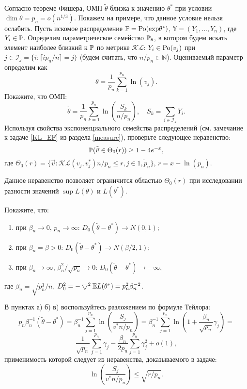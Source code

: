 \begin{problem}
Согласно теореме Фишера, ОМП $\tilde{\theta}$ близка к значению $\theta^*$ при условии $\dim \theta  = p_n = o(n^{1/3})$. Покажем на примере, что данное условие нельзя ослабить. Пусть искомое распределение $\mathrm{{\mathbb P}} = \mathrm{Po}(\mathrm{exp}{\theta^*})$, $\mathbb{Y} = (Y_1, ..., Y_n)$, где $Y_i \in \mathrm{{\mathbb P}}$. Определим параметрическое семейство $\mathrm{{\mathbb P}}_\theta$, в котором будем искать элемент наиболее близкий к  $\mathrm{{\mathbb P}}$ по метрике 
$\mathcal{KL}$: $Y_i \in \mathrm{Po}(v_j)$ при $j \in \mathcal{I}_j = \{i: \lceil i p_n / n \rceil = j \}$ (будем считать, что $n / p_n \in \mathbb{N}$). Оцениваемый параметр определим как 
\[
\theta = \frac{1}{p_n} \sum \limits_{k = 1}^{p_n} \ln (v_j).
\]
Покажите, что ОМП: 
\[
\tilde{\theta} = \frac{1}{p_n} \sum \limits_{k = 1}^{p_n} \ln \left(\frac{S_k} {n / p_n} \right), \quad S_k = \sum \limits_{i \in \mathcal{I}_k} Y_i.
\]
Используя свойства экспоненциального семейства распределений (см. замечание к задаче  \ref{KL_EF} из раздела \ref{measure}), проверьте следующее неравенство: 
\[
\mathrm{{\mathbb P}} (\tilde{\vec{v}} \in \Theta_0(r)) \geq 1 - 4 e^{-x},
\]
где $\Theta_0(r) = \{\vec{v}: \mathcal{KL}(v_j, v_j^*) n /p_n \leq r, j \in \overline{1, p_n} \}$, $r = x + \ln(p_n)$.

Данное неравенство позволяет ограничится областью $\Theta_0(r)$ при исследовании разности значений $\sup L(\theta)$ и $L(\theta^*)$.

Покажите, что:

\begin{enumerate}
\item при $\beta_n \to 0$, $p_n \to \infty$: 
$
D_0(\tilde{\theta} - \theta^*) \to N(0, 1);
$

\item при $\beta_n = \beta > 0$: 
$
D_0(\tilde{\theta} - \theta^*) \to N(\beta/2, 1);
$

\item при $\beta_n \to \infty$, $\beta_n^2 / \sqrt{p_n} \to 0$: 
$
D_0(\tilde{\theta} - \theta^*) \to -\infty,
$
\end{enumerate}
где $\beta_n = \sqrt{p_n^3 / n}$, $D_0^2 = -\bigtriangledown^{2} \mathrm{{\mathbb E}} L(\theta^{*}) = p_n^{2} \beta_n^{-2}$.

\end{problem}

\begin{ordre}
В пунктах а) б) в)  воспользуйтесь разложением по формуле Тейлора: 
\[
p_n \beta_n^{-1}(\tilde{\theta} - \theta^*) = \beta_n^{-1} \sum \limits_{j = 1}^{p_n}\ln \left(\frac{S_j} {v^* n / p_n} \right) = \beta_n^{-1} \sum \limits_{j = 1}^{p_n} \ln \left(1 + \frac{\beta_n}{\sqrt{p_n}}\gamma_j \right) = \]\[
\frac{1}{\sqrt{p_n}} \sum \limits_{j = 1}^{p_n}\gamma_j - \frac{\beta_n}{2 p_n} \sum \limits_{j = 1}^{p_n}\gamma_j^2 + o(1),
\]   
применимость которой следует из неравенства, доказываемого в задаче: 
\[
\ln \left(\frac{S_j} {v^* n / p_n} \right) \leq \sqrt{r/p_n}. 
\]

\end{ordre}









